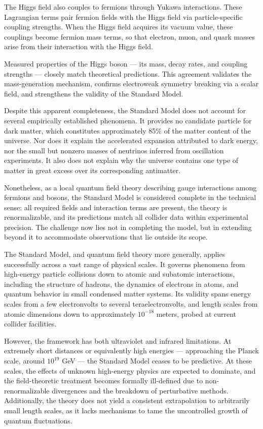 The Higgs field also couples to fermions through Yukawa interactions. These Lagrangian terms pair fermion fields with the Higgs field via particle-specific coupling strengths. When the Higgs field acquires its vacuum value, these couplings become fermion mass terms, so that electron, muon, and quark masses arise from their interaction with the Higgs field.

Measured properties of the Higgs boson — its mass, decay rates, and coupling strengths — closely match theoretical predictions. This agreement validates the mass-generation mechanism, confirms electroweak symmetry breaking via a scalar field, and strengthens the validity of the Standard Model.

Despite this apparent completeness, the Standard Model does not account for several empirically established phenomena. It provides no candidate particle for dark matter, which constitutes approximately 85\% of the matter content of the universe. Nor does it explain the accelerated expansion attributed to dark energy, nor the small but nonzero masses of neutrinos inferred from oscillation experiments. It also does not explain why the universe contains one type of matter in great excess over its corresponding antimatter.

Nonetheless, as a local quantum field theory describing gauge interactions among fermions and bosons, the Standard Model is considered complete in the technical sense: all required fields and interaction terms are present, the theory is renormalizable, and its predictions match all collider data within experimental precision. The challenge now lies not in completing the model, but in extending beyond it to accommodate observations that lie outside its scope.

The Standard Model, and quantum field theory more generally, applies successfully across a vast range of physical scales. It governs phenomena from high-energy particle collisions down to atomic and subatomic interactions, including the structure of hadrons, the dynamics of electrons in atoms, and quantum behavior in small condensed matter systems. Its validity spans energy scales from a few electronvolts to several teraelectronvolts, and length scales from atomic dimensions down to approximately $10^{-18}$ meters, probed at current collider facilities.

However, the framework has both ultraviolet and infrared limitations. At extremely short distances or equivalently high energies — approaching the Planck scale, around $10^{19}$ GeV — the Standard Model ceases to be predictive. At these scales, the effects of unknown high-energy physics are expected to dominate, and the field-theoretic treatment becomes formally ill-defined due to non-renormalizable divergences and the breakdown of perturbative methods. Additionally, the theory does not yield a consistent extrapolation to arbitrarily small length scales, as it lacks mechanisms to tame the uncontrolled growth of quantum fluctuations.

